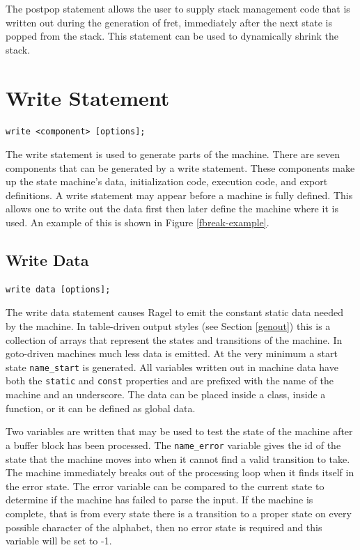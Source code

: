 \documentclass[letterpaper,11pt,oneside]{book}
\newcommand{\verbspace}{\vspace{10pt}}
\begin{document}
The postpop statement allows the user to supply stack management code that is
written out during the generation of fret, immediately after the next state is
popped from the stack. This statement can be used to dynamically shrink the
stack.

\section{Write Statement}
\label{write-statement}

\begin{verbatim}
write <component> [options];
\end{verbatim}
\verbspace

The write statement is used to generate parts of the machine. 
There are seven
components that can be generated by a write statement. These components make up the
state machine's data, initialization code, execution code, and export definitions.
A write statement may appear before a machine is fully defined.
This allows one to write out the data first then later define the machine where
it is used. An example of this is shown in Figure \ref{fbreak-example}.

\subsection{Write Data}
\begin{verbatim}
write data [options];
\end{verbatim}
\verbspace

The write data statement causes Ragel to emit the constant static data needed
by the machine. In table-driven output styles (see Section \ref{genout}) this
is a collection of arrays that represent the states and transitions of the
machine.  In goto-driven machines much less data is emitted. At the very
minimum a start state \verb|name_start| is generated.  All variables written
out in machine data have both the \verb|static| and \verb|const| properties and
are prefixed with the name of the machine and an
underscore. The data can be placed inside a class, inside a function, or it can
be defined as global data.

Two variables are written that may be used to test the state of the machine
after a buffer block has been processed. The \verb|name_error| variable gives
the id of the state that the machine moves into when it cannot find a valid
transition to take. The machine immediately breaks out of the processing loop when
it finds itself in the error state. The error variable can be compared to the
current state to determine if the machine has failed to parse the input. If the
machine is complete, that is from every state there is a transition to a proper
state on every possible character of the alphabet, then no error state is required
and this variable will be set to -1.
\end{document}
